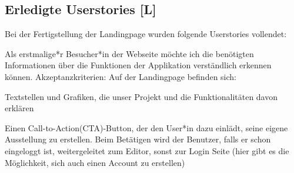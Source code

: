 \subsection{Erledigte Userstories [L]}
\label{Finished Landingpage}
Bei der Fertigstellung der Landingpage wurden folgende Userstories vollendet: 
\begin{compactitem}
    \item Als erstmalige*r Besucher*in der Webseite möchte ich die benötigten Informationen über die Funktionen der Applikation verständlich erkennen können. Akzeptanzkriterien:
    Auf der Landingpage befinden sich:
    \begin{compactitem}
        \item Textstellen und Grafiken, die unser Projekt und die Funktionalitäten davon erklären
        \item Einen Call-to-Action(CTA)-Button, der den User*in dazu einlädt, seine eigene Ausstellung zu erstellen. Beim Betätigen wird der Benutzer, falls er schon eingeloggt ist, weitergeleitet zum Editor, sonst zur Login Seite (hier gibt es die Möglichkeit, sich auch einen Account zu erstellen)
    \end{compactitem}
\end{compactitem}

